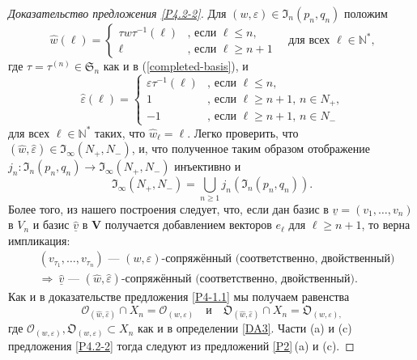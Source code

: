 \documentclass{amsart}
\theoremstyle{definition}
\newcommand{\bs}[1]{\boldsymbol{#1}}
\begin{document}
\begin{proof}[Доказательство предложения \ref{P4.2-2}]
Для $(w,\varepsilon)\in\mathfrak{I}_n(p_n,q_n)$
положим
\begin{equation}
\label{4.5.4}
\hat{w}(\ell)=\left\{
\begin{array}{ll}
\tau w\tau^{-1}(\ell) & \mbox{, если $\ell\leq n$,} \\
\ell & \mbox{, если $\ell\geq n+1$}
\end{array}
\right.\quad\mbox{для всех $\ell\in\mathbb{N}^*$,}
\end{equation}
где $\tau=\tau^{(n)}\in\mathfrak{S}_n$ как и в (\ref{completed-basis}), и
\begin{equation}
\label{4.5.5}\hat{\varepsilon}(\ell)=\left\{
\begin{array}{ll}
\varepsilon\tau^{-1}(\ell) & \mbox{, если $\ell\leq n$,} \\
1 & \mbox{, если $\ell\geq n+1$, $n\in N_+$,} \\
-1 & \mbox{, если $\ell\geq n+1$, $n\in N_-$}
\end{array}
\right.
\end{equation}
для всех $\ell\in\mathbb{N}^*$ таких, что $\hat{w}_\ell=\ell$.
Легко проверить, что $(\hat{w},\hat{\varepsilon})\in\mathfrak{I}_\infty(N_+,N_-)$,
и, что полученное таким образом отображение $j_n:\mathfrak{I}_n(p_n,q_n)\to\mathfrak{I}_\infty(N_+,N_-)$ инъективно
и
\[
\mathfrak{I}_\infty(N_+,N_-)=\bigcup_{n\geq 1}j_n(\mathfrak{I}_n(p_n,q_n)).
\]
Более того, из нашего построения следует, что, если дан базис в $\underline{v}=(v_1,\ldots,v_n)$ в $V_n$ и базис $\underline{\hat{v}}$ в $\mathbf{V}$ получается добавлением векторов $e_\ell$ для $\ell\geq n+1$, то верна импликация:
\begin{eqnarray*}
 & \mbox{$(v_{\tau_1},\ldots,v_{\tau_n})$ --- $(w,\varepsilon)$-сопряжённый (соответственно, двойственный)} \\
 & \Rightarrow \
\mbox{$\underline{\hat{v}}$ --- $(\hat{w},\hat{\varepsilon})$-сопряжённый (соответственно, двойственный)}.
\end{eqnarray*}
Как и в доказательстве предложения \ref{P4-1.1} мы получаем равенства
\begin{equation}
\label{T-proof.2}
\bs{\mathcal{O}}_{(\hat{w},\hat{\varepsilon})}\cap X_{n}=\mathcal{O}_{(w,\varepsilon)}
\quad
\mbox{и}
\quad
\bs{\mathfrak{O}}_{(\hat{w},\hat{\varepsilon})}\cap X_{n}=\mathfrak{O}_{(w,\varepsilon),}
\end{equation}
где $\mathcal{O}_{(w,\varepsilon)},\mathfrak{O}_{(w,\varepsilon)}\subset X_{n}$ как и в определении \ref{DA3}.
Части {\rm (a)} и {\rm (c)} предложения \ref{P4.2-2} тогда следуют
из предложений \ref{P2}\,{\rm (a)} и {\rm (c)}.
\end{proof}
\end{document}
